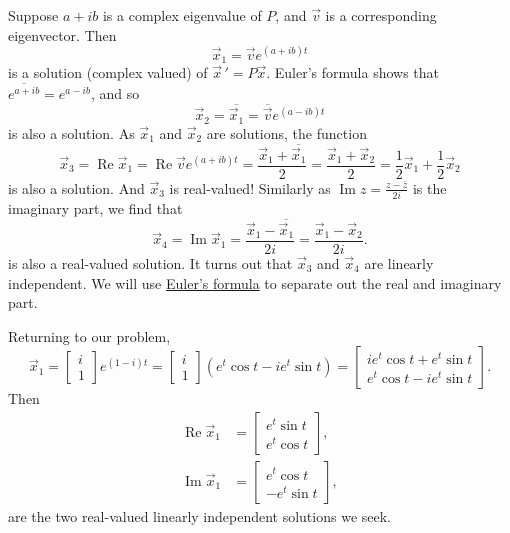 \documentclass[12pt]{book}
\begin{document}
Suppose $a + ib$ is a complex eigenvalue of $P$, and $\vec{v}$
is a corresponding eigenvector.  Then
\begin{equation*}
\vec{x}_1 = \vec{v} e^{(a+ib)t}
\end{equation*}
is a solution (complex valued) of
${\vec{x}\,}' = P \vec{x}$.  Euler's formula shows that $\overline{e^{a+ib}} =
e^{a-ib}$,
and so
\begin{equation*}
\vec{x}_2 = \overline{\vec{x}_1} = \overline{\vec{v}} e^{(a-ib)t}
\end{equation*}
is also a solution.
As $\vec{x}_1$ and $\vec{x}_2$ are solutions, the function
\begin{equation*}
\vec{x}_3 =
\operatorname{Re} \vec{x}_1 =
\operatorname{Re} \vec{v} e^{(a+ib)t} =
\frac{\vec{x}_1 + \overline{\vec{x}_1}}{2}  =
\frac{\vec{x}_1 + \vec{x}_2}{2} 
=
\frac{1}{2} \vec{x}_1 + \frac{1}{2}\vec{x}_2
\end{equation*}
is also a solution.  And $\vec{x}_3$ is real-valued!  Similarly as
$\operatorname{Im} z = \frac{z-\bar{z}}{2i}$ is the imaginary part, we find
that
\begin{equation*}
\vec{x}_4 =
\operatorname{Im} \vec{x}_1 =
\frac{\vec{x}_1 - \overline{\vec{x}_1}}{2i}  =
\frac{\vec{x}_1 - \vec{x}_2}{2i} .
\end{equation*}
is also a real-valued solution.  It turns out that $\vec{x}_3$ and
$\vec{x}_4$ are linearly independent.
We will use \hyperref[eulersformula]{Euler's formula}
to separate out the real and imaginary part.

\medskip

Returning to our problem,
\begin{equation*}
\vec{x}_1 =
\begin{bmatrix} i \\ 1 \end{bmatrix} e^{(1-i)t}
=
\begin{bmatrix} i \\ 1 \end{bmatrix} \left( e^t \cos t - i e^t \sin t \right)
=
\begin{bmatrix}
i e^t \cos t + e^t \sin t  \\
e^t \cos t - i e^t \sin t
\end{bmatrix}
.
\end{equation*}
Then
\begin{align*}
\operatorname{Re} \vec{x}_1 & = 
\begin{bmatrix}
e^t \sin t  \\
e^t \cos t
\end{bmatrix} ,
\\
\operatorname{Im} \vec{x}_1 & = 
\begin{bmatrix}
e^t \cos t \\
- e^t \sin t
\end{bmatrix} ,
\end{align*}
are the two real-valued linearly independent solutions we seek.
\end{document}

